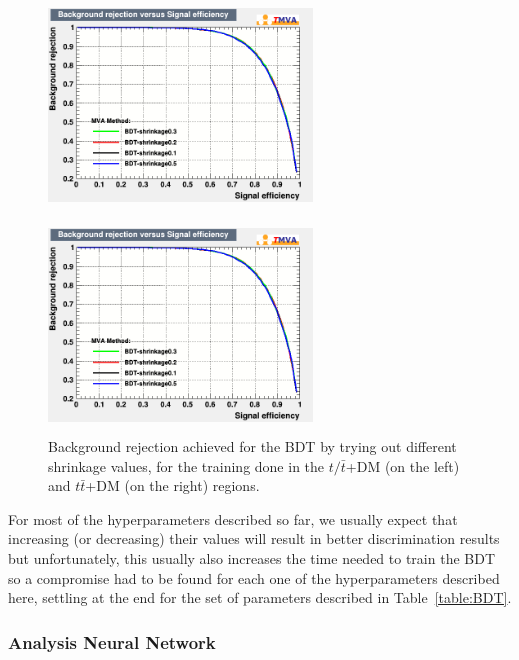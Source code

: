 \documentclass[a4paper, 10pt, openright]{report}
\begin{document}
\begin{appendices}
\begin{figure}[htbp]
\centering
\begin{minipage}[b]{.48\textwidth}
\includegraphics[width=7cm, height=5.7cm]{figs/BDT_shrinkage_ST.png}
\end{minipage}\hfill
\begin{minipage}[b]{.48\textwidth}
\includegraphics[width=7cm, height=5.7cm]{figs/BDT_shrinkage_TTbar.png}
\end{minipage} \hfill
\caption{Background rejection achieved for the \ac{BDT} by trying out different shrinkage values, for the training done in the $t/ \bar t$+DM (on the left) and $t \bar t$+DM (on the right) regions.}
\label{fig:optShrinkage}
\end{figure}

For most of the hyperparameters described so far, we usually expect that increasing (or decreasing) their values will result in better discrimination results but unfortunately, this usually also increases the time needed to train the \ac{BDT} so a compromise had to be found for each one of the hyperparameters described here, settling at the end for the set of parameters described in Table~\ref{table:BDT}.

\subsubsection{Analysis Neural Network}


\end{appendices}
\end{document}
